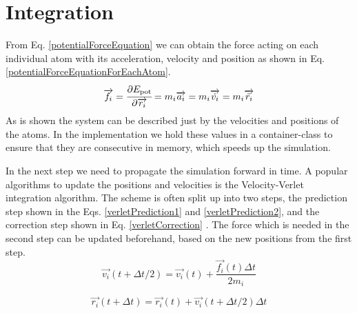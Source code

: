 \section{Integration}
\begin{comment}
- obtain force from the previous equation
- dirivation in v. r.. from the mass
- system can be discribed just by the velocity and postion of each atom
- in the simulation the positions and velocities of the individual atoms have to be tracked and updated accordingly
- most used  is the Velocity-Verlet Algorithm
\end{comment}
From Eq. \ref{potentialForceEquation} we can obtain the force acting on each individual atom with its acceleration, velocity and position as shown in  Eq. \ref{potentialForceEquationForEachAtom}. 
\begin{equation}
	\label{potentialForceEquationForEachAtom}
	\overrightarrow{f_{i}} = \cfrac{\displaystyle\partial E_{\mathrm{pot}}}{\displaystyle \partial \overrightarrow{r_{i}}} = m_{i}\overrightarrow{a_{i}} = m_{i}\overrightarrow{\dot{v_{i}}} = m_{i}\overrightarrow{\ddot{r_{i}}}
\end{equation}
As is shown the system can be described just by the velocities and positions of the atoms. 
In the implementation we hold these values in a container-class to ensure that they are consecutive in  memory, which speeds up the simulation. 
\par
In the next step we need to propagate the simulation forward in time. A popular algorithms to update the positions and velocities is the Velocity-Verlet integration algorithm.
The scheme is often split up into two steps, the prediction step shown in the Eqs.  \ref{verletPrediction1} and \ref{verletPrediction2}, and the correction step shown in Eq. \ref{verletCorrection} \cite[cf. ][]{molDymCourse}. The force which is needed in the second step can be updated beforehand, based on the new positions from the first step.
\begin{equation}
	\label{verletPrediction1}
	\overrightarrow{v_{i}}(t+\Delta t/2) = 
	\overrightarrow{v_{i}}(t) + 
	\frac{\overrightarrow{f_{i}}(t)\Delta t}{2m_{i}}
\end{equation}

\begin{equation}
	\label{verletPrediction2}
	\overrightarrow{r_{i}}(t+ \Delta t) = 
	\overrightarrow{r_{i}}(t) + \overrightarrow{v_{i}}(t + \Delta t/2)\Delta t
\end{equation}

